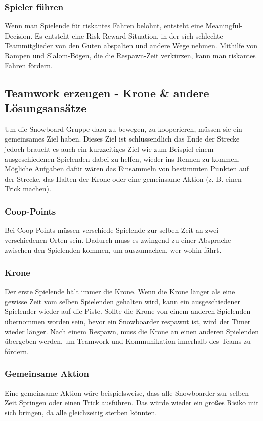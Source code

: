 \subsubsection{Spieler führen}
Wenn man Spielende für riskantes Fahren belohnt, entsteht eine Meaningful-Decision. Es entsteht eine Risk-Reward Situation, in der sich schlechte Teammitglieder von den Guten abspalten und andere Wege nehmen. Mithilfe von Rampen und Slalom-Bögen, die die Respawn-Zeit verkürzen, kann man riskantes Fahren fördern.

\subsection{Teamwork erzeugen - Krone \& andere Lösungsansätze\label{_teamwork_erzeugen}}
Um die Snowboard-Gruppe dazu zu bewegen, zu kooperieren, müssen sie ein gemeinsames Ziel haben. Dieses Ziel ist schlussendlich das Ende der Strecke jedoch braucht es auch ein kurzzeitiges Ziel wie zum Beispiel einem ausgeschiedenen Spielenden dabei zu helfen, wieder ins Rennen zu kommen. Mögliche Aufgaben dafür wären das Einsammeln von bestimmten Punkten auf der Strecke, das Halten der Krone oder eine gemeinsame Aktion (z. B. einen Trick machen).

\subsubsection{Coop-Points}
Bei Coop-Points müssen verschiede Spielende zur selben Zeit an zwei verschiedenen Orten sein. Dadurch muss es zwingend zu einer Absprache zwischen den Spielenden kommen, um auszumachen, wer wohin fährt.

\subsubsection{Krone\label{_krone}}
Der erste Spielende hält immer die Krone. Wenn die Krone länger als eine gewisse Zeit vom selben Spielenden gehalten wird, kann ein ausgeschiedener Spielender wieder auf die Piste. Sollte die Krone von einem anderen Spielenden übernommen worden sein, bevor ein Snowboarder respawnt ist, wird der Timer wieder länger. Nach einem Respawn, muss die Krone an einen anderen Spielenden übergeben werden, um Teamwork und Kommunikation innerhalb des Teams zu fördern.

\subsubsection{Gemeinsame Aktion}
Eine gemeinsame Aktion wäre beispielsweise, dass alle Snowboarder zur selben Zeit Springen oder einen Trick ausführen. Das würde wieder ein großes Risiko mit sich bringen, da alle gleichzeitig sterben könnten.

